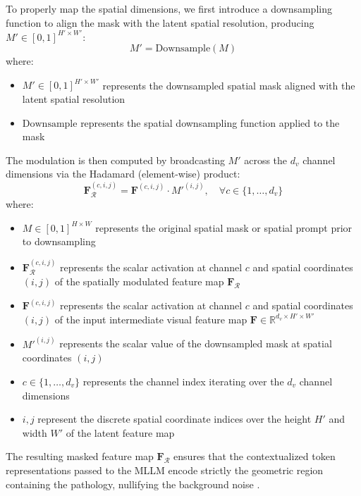 To properly map the spatial dimensions, we first introduce a downsampling function to align the mask with the latent spatial resolution, producing $M'\in[0,1]^{H'\times W'}$:
\begin{equation}
M' = \text{Downsample}(M)
\end{equation}
where:
\begin{itemize}
    \item $M' \in [0,1]^{H'\times W'}$ represents the downsampled spatial mask aligned with the latent spatial resolution
    \item $\text{Downsample}$ represents the spatial downsampling function applied to the mask
\end{itemize}

The modulation is then computed by broadcasting $M'$ across the $d_v$ channel dimensions via the Hadamard (element-wise) product:
\begin{equation}
\mathbf{F}_{\mathcal{R}}^{(c, i, j)} = \mathbf{F}^{(c, i, j)} \cdot M'^{(i, j)}, \quad \forall c \in \{1, \dots, d_v\}
\end{equation}
where:
\begin{itemize}
\item $M \in [0,1]^{H\times W}$ represents the original spatial mask or spatial prompt prior to downsampling
\item $\mathbf{F}_{\mathcal{R}}^{(c, i, j)}$ represents the scalar activation at channel $c$ and spatial coordinates $(i, j)$ of the spatially modulated feature map $\mathbf{F}_{\mathcal{R}}$
\item $\mathbf{F}^{(c, i, j)}$ represents the scalar activation at channel $c$ and spatial coordinates $(i, j)$ of the input intermediate visual feature map $\mathbf{F} \in \mathbb{R}^{d_v \times H' \times W'}$
\item $M'^{(i, j)}$ represents the scalar value of the downsampled mask at spatial coordinates $(i, j)$
\item $c \in \{1, \dots, d_v\}$ represents the channel index iterating over the $d_v$ channel dimensions
\item $i, j$ represent the discrete spatial coordinate indices over the height $H'$ and width $W'$ of the latent feature map
\end{itemize}

The resulting masked feature map $\mathbf{F}_{\mathcal{R}}$ ensures that the contextualized token representations passed to the MLLM encode strictly the geometric region containing the pathology, nullifying the background noise \cite{li2024red-circle-prompt}.

